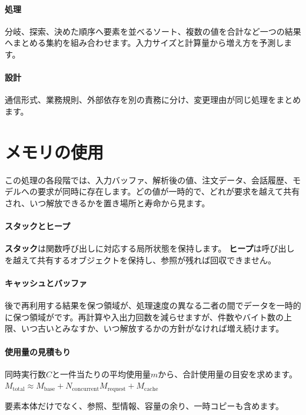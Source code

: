 \par
\endgroup
\medskip
\begingroup
\paragraph{処理}
        分岐、探索、決めた順序へ要素を並べるソート、複数の値を合計など一つの結果へまとめる集約を組み合わせます。入力サイズと計算量から増え方を予測します。

\par
\endgroup
\medskip
\begingroup
\paragraph{設計}
        通信形式、業務規則、外部依存を別の責務に分け、変更理由が同じ処理をまとめます。

\par
\endgroup
\par
\endgroup


\section{メモリの使用}
\label{sec:07-practice-05}

この処理の各段階では、入力バッファ、解析後の値、注文データ、会話履歴、モデルへの要求が同時に存在します。どの値が一時的で、どれが要求を越えて共有され、いつ解放できるかを置き場所と寿命から見ます。

\begingroup
\begingroup
\paragraph{スタックとヒープ}
        \textbf{スタック}は関数呼び出しに対応する局所状態を保持します。
        \textbf{ヒープ}は呼び出しを越えて共有するオブジェクトを保持し、参照が残れば回収できません。

\paragraph{キャッシュとバッファ}
        後で再利用する結果を保つ領域が、処理速度の異なる二者の間でデータを一時的に保つ領域がです。再計算や入出力回数を減らせますが、件数やバイト数の上限、いつ古いとみなすか、いつ解放するかの方針がなければ増え続けます。

\par
\endgroup
\medskip
\begingroup
\paragraph{使用量の見積もり}
        同時実行数$C$と一件当たりの平均使用量$m$から、合計使用量の目安を求めます。
        \centering
        $
          M_{\mathrm{total}} \approx
          M_{\mathrm{base}} + N_{\mathrm{concurrent}}M_{\mathrm{request}}
          + M_{\mathrm{cache}}
        $\par
        要素本体だけでなく、参照、型情報、容量の余り、一時コピーも含めます。

